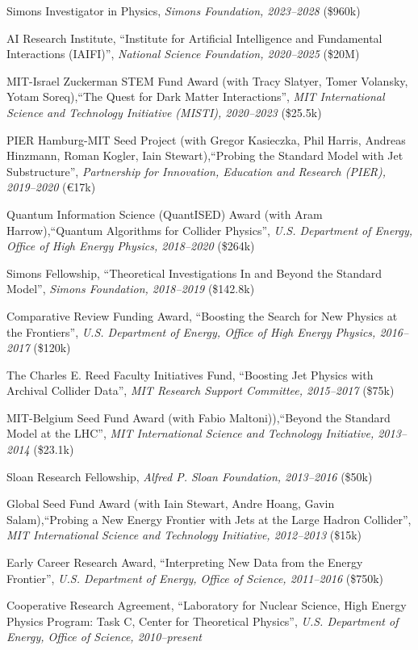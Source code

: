 \bbl
\item Simons Investigator in Physics, \textit{Simons Foundation, 2023--2028}
(\$960k)
\item AI Research Institute, ``Institute for Artificial Intelligence and Fundamental Interactions (IAIFI)'', \textit{National Science Foundation, 2020--2025}
(\$20M)
\item MIT-Israel Zuckerman STEM Fund Award (with Tracy Slatyer, Tomer Volansky, Yotam Soreq),``The Quest for Dark Matter Interactions'', \textit{MIT International Science and Technology Initiative (MISTI), 2020--2023}
(\$25.5k)
\item PIER Hamburg-MIT Seed Project (with Gregor Kasieczka, Phil Harris, Andreas Hinzmann, Roman Kogler, Iain Stewart),``Probing the Standard Model with Jet Substructure'', \textit{Partnership for Innovation, Education and Research (PIER), 2019--2020}
(\euro17k)
\item Quantum Information Science (QuantISED) Award (with Aram Harrow),``Quantum Algorithms for Collider Physics'', \textit{U.S. Department of Energy, Office of High Energy Physics, 2018--2020}
(\$264k)
\item Simons Fellowship, ``Theoretical Investigations In and Beyond the Standard Model'', \textit{Simons Foundation, 2018--2019}
(\$142.8k)
\item Comparative Review Funding Award, ``Boosting the Search for New Physics at the Frontiers'', \textit{U.S. Department of Energy, Office of High Energy Physics, 2016--2017}
(\$120k)
\item The Charles E. Reed Faculty Initiatives Fund, ``Boosting Jet Physics with Archival Collider Data'', \textit{MIT Research Support Committee, 2015--2017}
(\$75k)
\item MIT-Belgium Seed Fund Award (with Fabio Maltoni)),``Beyond the Standard Model at the LHC'', \textit{MIT International Science and Technology Initiative, 2013--2014}
(\$23.1k)
\item Sloan Research Fellowship, \textit{Alfred P. Sloan Foundation, 2013--2016}
(\$50k)
\item Global Seed Fund Award (with Iain Stewart, Andre Hoang, Gavin Salam),``Probing a New Energy Frontier with Jets at the Large Hadron Collider'', \textit{MIT International Science and Technology Initiative, 2012--2013}
(\$15k)
\item Early Career Research Award, ``Interpreting New Data from the Energy Frontier'', \textit{U.S. Department of Energy, Office of Science, 2011--2016}
(\$750k)
\item Cooperative Research Agreement, ``Laboratory for Nuclear Science, High Energy Physics Program: Task C, Center for Theoretical Physics'', \textit{U.S. Department of Energy, Office of Science, 2010--present}

\el
